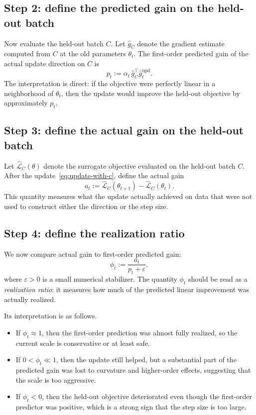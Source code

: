\documentclass[11pt]{article}
\begin{document}
\subsection{Step 2: define the predicted gain on the held-out batch}
Now evaluate the held-out batch $C$. Let $\hat g_C$ denote the gradient estimate computed from $C$ at the old parameters $\theta_t$. The first-order predicted gain of the actual update direction on $C$ is
\begin{equation}
p_t
:=
\alpha_t \, \hat g_C^\top \hat g_t^{\mathrm{upd}}.
\label{eq:pt-def}
\end{equation}
The interpretation is direct: if the objective were perfectly linear in a neighborhood of $\theta_t$, then the update would improve the held-out objective by approximately $p_t$.

\subsection{Step 3: define the actual gain on the held-out batch}
Let $\widehat{\mathcal L}_C(\theta)$ denote the surrogate objective evaluated on the held-out batch $C$. After the update~\eqref{eq:update-with-c}, define the actual gain
\begin{equation}
a_t
:=
\widehat{\mathcal L}_C(\theta_{t+1})
-
\widehat{\mathcal L}_C(\theta_t).
\label{eq:at-def}
\end{equation}
This quantity measures what the update actually achieved on data that were not used to construct either the direction or the step size.

\subsection{Step 4: define the realization ratio}
We now compare actual gain to first-order predicted gain:
\begin{equation}
\phi_t
:=
\frac{a_t}{p_t + \varepsilon},
\label{eq:phi-def}
\end{equation}
where $\varepsilon>0$ is a small numerical stabilizer. The quantity $\phi_t$ should be read as a \emph{realization ratio}: it measures how much of the predicted linear improvement was actually realized.

Its interpretation is as follows.
\begin{itemize}
    \item If $\phi_t \approx 1$, then the first-order prediction was almost fully realized, so the current scale is conservative or at least safe.
    \item If $0 < \phi_t \ll 1$, then the update still helped, but a substantial part of the predicted gain was lost to curvature and higher-order effects, suggesting that the scale is too aggressive.
    \item If $\phi_t < 0$, then the held-out objective deteriorated even though the first-order predictor was positive, which is a strong sign that the step size is too large.
\end{itemize}
\end{document}
